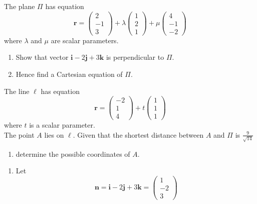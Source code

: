 \documentclass[leqno]{article}
\begin{document}
\begin{enumerate}[
  label=\textbf{\arabic*.},
  leftmargin=*,
  topsep=0pt,
  partopsep=0pt,
  parsep=0pt
]
The plane $\Pi$ has equation
\[
\mathbf{r}=\begin{pmatrix}2\\-1\\3\end{pmatrix}+\lambda\begin{pmatrix}1\\2\\1\end{pmatrix}+\mu\begin{pmatrix}4\\-1\\-2\end{pmatrix}
\]
where $\lambda$ and $\mu$ are scalar parameters. \\
\begin{enumerate}[label=\textbf{(\alph*)}]
  \item Show that vector $\mathbf{i}-2\mathbf{j}+3\mathbf{k}$ is perpendicular to $\Pi$.  \\
  \item Hence find a Cartesian equation of $\Pi$.  \\
\end{enumerate}
The line $\ell$ has equation
\[
\mathbf{r}=\begin{pmatrix}-2\\1\\4\end{pmatrix}+t\begin{pmatrix}1\\1\\1\end{pmatrix}
\]
where $t$ is a scalar parameter. \\

The point $A$ lies on $\ell$. Given that the shortest distance between $A$ and $\Pi$ is $\tfrac{9}{\sqrt{14}}$ \\
\begin{enumerate}[label=\textbf{(\alph*)}, resume]
  \item determine the possible coordinates of $A$.  \\
\end{enumerate}

\vspace*{30pt}

\begin{tcolorbox}[colback=white, colframe=scarlet, title={\textbf{Solution}}, breakable, grow to left by=6mm, grow to right by=10mm]
\begin{enumerate}[label=\textbf{(\alph*)}]
  \item Let
  \[
  \mathbf n=\mathbf i-2\mathbf j+3\mathbf k=\begin{pmatrix}1\\-2\\3\end{pmatrix}
  \]
  

\end{enumerate}
\end{tcolorbox}
\end{enumerate}
\end{document}
